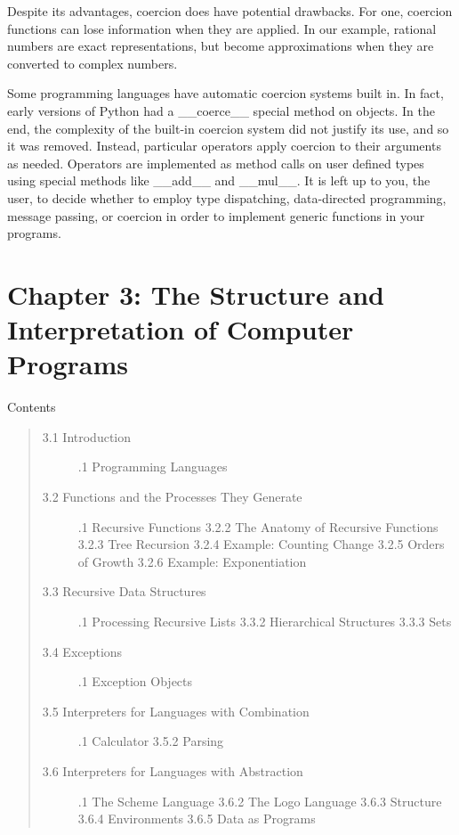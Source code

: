 \documentclass[letterpaper,10pt,dvipdfmx]{sphinxmanual}
\begin{document}
Despite its advantages, coercion does have potential drawbacks. For one, coercion functions can lose information when they are applied. In our example, rational numbers are exact representations, but become approximations when they are converted to complex numbers.

Some programming languages have automatic coercion systems built in. In fact, early versions of Python had a \_\_coerce\_\_ special method on objects. In the end, the complexity of the built-in coercion system did not justify its use, and so it was removed. Instead, particular operators apply coercion to their arguments as needed. Operators are implemented as method calls on user defined types using special methods like \_\_add\_\_ and \_\_mul\_\_. It is left up to you, the user, to decide whether to employ type dispatching, data-directed programming, message passing, or coercion in order to implement generic functions in your programs.


\chapter{Chapter 3: The Structure and Interpretation of Computer Programs}
\label{interpretation::doc}\label{interpretation:chapter-3-the-structure-and-interpretation-of-computer-programs}
Contents
\begin{quote}
\begin{description}
\item[{3.1   Introduction}] .1   Programming Languages

\item[{3.2   Functions and the Processes They Generate}] .1   Recursive Functions
3.2.2   The Anatomy of Recursive Functions
3.2.3   Tree Recursion
3.2.4   Example: Counting Change
3.2.5   Orders of Growth
3.2.6   Example: Exponentiation

\item[{3.3   Recursive Data Structures}] .1   Processing Recursive Lists
3.3.2   Hierarchical Structures
3.3.3   Sets

\item[{3.4   Exceptions}] .1   Exception Objects

\item[{3.5   Interpreters for Languages with Combination}] .1   Calculator
3.5.2   Parsing

\item[{3.6   Interpreters for Languages with Abstraction}] .1   The Scheme Language
3.6.2   The Logo Language
3.6.3   Structure
3.6.4   Environments
3.6.5   Data as Programs

\end{description}
\end{quote}
\end{document}
